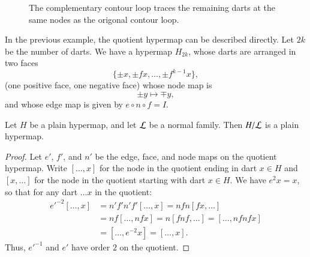\begin{figure}[htb]
  \centering
  \caption{The complementary contour loop traces the remaining darts
   at the same nodes as the origonal contour loop.}
  \label{fig:contour-comp}
\end{figure}


\begin{example}\label{ex:H2k} 
In the previous example, the quotient hypermap can
be described directly.  Let $2k$ be the number of darts.  We have a
hypermap $H_{2k}$, whose darts are arranged in two faces
    $$\{\pm x,\pm f x,\ldots, \pm f^{k-1} x\},$$
(one positive face, one negative face) whose node map is
    $$\pm y \mapsto \mp y,$$
and whose edge map is given by $e\circ n\circ f = I$.
\end{example}

\begin{lemma} Let $H$ be a plain hypermap, and let $\cal L$ be a
normal family.  Then $H/{\cal L}$ is a plain hypermap.
\end{lemma}

\begin{proof} Let $e'$, $f'$, and $n'$ be the edge, face, and node maps on the
quotient hypermap.  Write $[\ldots, x]$ for the node in the quotient
ending in dart $x\in H$ and $[x,\ldots]$ for the node in the quotient
starting with dart $x\in H$.  We have $e^2 x = x$, so that for any
dart $\ldots x$ in the quotient:
    $$\begin{array}{lll}
    {e'}^{-2} [\ldots, x] &= n' f' n' f' [\ldots, x] = n f n [f x, \ldots] \\&=
    n f [\ldots, n f x] = n [f n f, \ldots] = [\ldots, n f n f x]\\ &=
    [\ldots, e^{-2} x] = [\ldots, x].
    \end{array}$$
Thus, ${e'}^{-1}$ and $e'$ have order $2$ on the quotient.
\end{proof}

%



